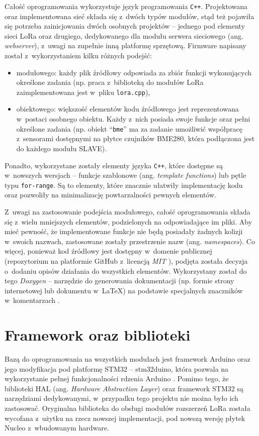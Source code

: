 Całość oprogramowania wykorzystuje język programowania \texttt{C++}. Projektowana oraz implementowana sieć składa się
z~dwóch typów modułów, stąd też pojawiła się potrzeba zainicjowania dwóch osobnych projektów -- jednego pod elementy
sieci LoRa oraz drugiego, dedykowanego dla modułu serwera sieciowego (ang. \textsl{webserver}), z~uwagi na zupełnie inną
platformę sprzętową. Firmware napisany został z~wykorzystaniem kilku różnych podejść:
\begin{itemize}[label=--]
    \item modułowego: każdy plik źródłowy odpowiada za zbiór funkcji wykonujących określone zadania (np. praca
          z~biblioteką do modułów LoRa zaimplementowana jest w~pliku \texttt{lora.cpp}),
    \item obiektowego: większość elementów kodu źródłowego jest reprezentowana w~postaci osobnego obiektu. Każdy
          z~nich posiada swoje funkcje oraz pełni określone zadania (np. obiekt \enquote{\texttt{bme}} ma za zadanie
          umożliwić współpracę z~sensorami dostępnymi na płytce czujników BME280, która podłączona jest do każdego
          modułu SLAVE).
\end{itemize}
Ponadto, wykorzystane zostały elementy języka \texttt{C++}, które dostępne są w~nowszych wersjach -- funkcje szablonowe
(ang. \textsl{template functions}) lub pętle typu \texttt{for-range}. Są to elementy, które znacznie ułatwiły
implementację kodu oraz pozwoliły na minimalizację powtarzalności pewnych elementów.

Z~uwagi na zastosowanie podejścia modułowego, całość oprogramowania składa się z~wielu mniejszych elementów,
podzielonych na odpowiadające im pliki. Aby mieć pewność, że implementowane funkcje nie będą posiadały żadnych kolizji
w~swoich nazwach, zastosowane zostały przestrzenie nazw (ang. \textsl{namespaces}). Co więcej, ponieważ kod źródłowy
jest dostępny w~domenie publicznej (repozytorium na platformie GitHub z~licencją \textsl{MIT} \cite{snyk-sw-license}),
podjęta została decyzja o~dodaniu opisów działania do wszystkich elementów. Wykorzystany został do tego \textsl{Doxygen}
-- narzędzie do generowania dokumentacji (np. formie strony internetowej lub dokumentu w~\LaTeX) na podstawie
specjalnych znaczników w~komentarzach \cite{doxygen}.

\FloatBarrier
\section{Framework oraz biblioteki\label{sect:framework-libraries}} Bazą do oprogramowania na wszystkich modułach jest
framework Arduino oraz jego modyfikacja pod platformę STM32 -- stm32duino, która pozwala na wykorzystanie pełnej
funkcjonalności rdzenia Arduino \cite{stm32duino-docs}. Pomimo tego, że biblioteki HAL (ang. \textsl{Hardware
    Abstraction Layer}) oraz framework STM32 są narzędziami dedykowanymi, w~przypadku tego projektu nie można było ich
zastosować. Oryginalna biblioteka do obsługi modułów rozszerzeń LoRa została wycofana z~użytku na rzecz nowszej
implementacji, pod nowszą wersję płytek Nucleo z~wbudowanym hardware.

